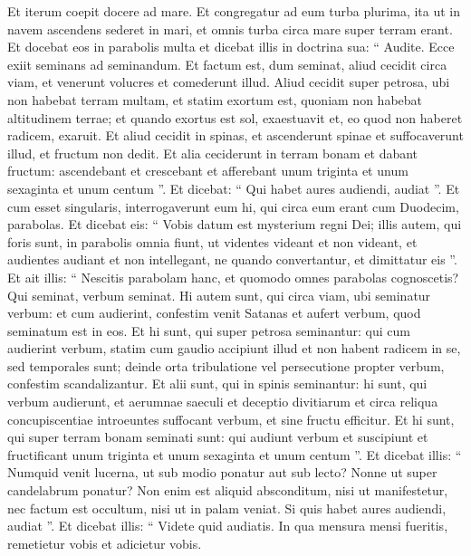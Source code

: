 \begin{biblechapter}
\begin{biblechapter}
\begin{biblechapter}
\begin{biblechapter}
\verse Et iterum coepit docere ad mare. Et congregatur ad eum turba plurima, ita ut in navem ascendens sederet in mari, et omnis turba circa mare super terram erant. 
\verse Et docebat eos in parabolis multa et dicebat illis in doctrina sua: 
\verse “ Audite. Ecce exiit seminans ad seminandum. 
\verse Et factum est, dum seminat, aliud cecidit circa viam, et venerunt volucres et comederunt illud. 
\verse Aliud cecidit super petrosa, ubi non habebat terram multam, et statim exortum est, quoniam non habebat altitudinem terrae; 
\verse et quando exortus est sol, exaestuavit et, eo quod non haberet radicem, exaruit. 
\verse Et aliud cecidit in spinas, et ascenderunt spinae et suffocaverunt illud, et fructum non dedit. 
\verse Et alia ceciderunt in terram bonam et dabant fructum: ascendebant et crescebant et afferebant unum triginta et unum sexaginta et unum centum ”. 
\verse Et dicebat: “ Qui habet aures audiendi, audiat ”.
 \verse Et cum esset singularis, interrogaverunt eum hi, qui circa eum erant cum Duodecim, parabolas. 
\verse Et dicebat eis: “ Vobis datum est mysterium regni Dei; illis autem, qui foris sunt, in parabolis omnia fiunt,
 \verse ut videntes videant et non videant,
 et audientes audiant et non intellegant,
 ne quando convertantur,
 et dimittatur eis ”.
 \verse Et ait illis: “ Nescitis parabolam hanc, et quomodo omnes parabolas cognoscetis? 
\verse Qui seminat, verbum seminat. 
\verse Hi autem sunt, qui circa viam, ubi seminatur verbum: et cum audierint, confestim venit Satanas et aufert verbum, quod seminatum est in eos. 
\verse Et hi sunt, qui super petrosa seminantur: qui cum audierint verbum, statim cum gaudio accipiunt illud 
\verse et non habent radicem in se, sed temporales sunt; deinde orta tribulatione vel persecutione propter verbum, confestim scandalizantur. 
\verse Et alii sunt, qui in spinis seminantur: hi sunt, qui verbum audierunt, 
\verse et aerumnae saeculi et deceptio divitiarum et circa reliqua concupiscentiae introeuntes suffocant verbum, et sine fructu efficitur. 
\verse Et hi sunt, qui super terram bonam seminati sunt: qui audiunt verbum et suscipiunt et fructificant unum triginta et unum sexaginta et unum centum ”.
 \verse Et dicebat illis: “ Numquid venit lucerna, ut sub modio ponatur aut sub lecto? Nonne ut super candelabrum ponatur? 
\verse Non enim est aliquid absconditum, nisi ut manifestetur, nec factum est occultum, nisi ut in palam veniat. 
\verse Si quis habet aures audiendi, audiat ”.
 \verse Et dicebat illis: “ Videte quid audiatis. In qua mensura mensi fueritis, remetietur vobis et adicietur vobis. 

\end{biblechapter}
\end{biblechapter}
\end{biblechapter}
\end{biblechapter}
